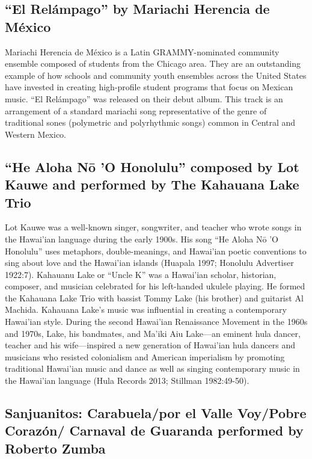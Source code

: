 \documentclass[twoside]{article}
\begin{document}
\hypertarget{el-reluxe1mpago-by-mariachi-herencia-de-muxe9xico}{%
\subsection*{``El Relámpago'' by Mariachi Herencia de
México}\label{el-reluxe1mpago-by-mariachi-herencia-de-muxe9xico}}

Mariachi Herencia de México is a Latin GRAMMY-nominated community
ensemble composed of students from the Chicago area. They are an
outstanding example of how schools and community youth ensembles across
the United States have invested in creating high-profile student
programs that focus on Mexican music. ``El Relámpago'' was released on
their debut album. This track is an arrangement of a standard mariachi
song representative of the genre of traditional sones (polymetric and
polyrhythmic songs) common in Central and Western Mexico.

\hypertarget{he-aloha-nux14d-o-honolulu-composed-by-lot-kauwe-and-performed-by-the-kahauana-lake-trio}{%
\subsection*{``He Aloha Nō 'O Honolulu'' composed by Lot Kauwe and
performed by The Kahauana Lake
Trio}\label{he-aloha-nux14d-o-honolulu-composed-by-lot-kauwe-and-performed-by-the-kahauana-lake-trio}}

Lot Kauwe was a well-known singer, songwriter, and teacher who wrote
songs in the Hawai'ian language during the early 1900s. His song ``He
Aloha Nō 'O Honolulu'' uses metaphors, double-meanings, and Hawai'ian
poetic conventions to sing about love and the Hawai'ian islands (Huapala
1997; Honolulu Advertiser 1922:7). Kahauanu Lake or ``Uncle K'' was a
Hawai'ian scholar, historian, composer, and musician celebrated for his
left-handed ukulele playing. He formed the Kahauana Lake Trio with
bassist Tommy Lake (his brother) and guitarist Al Machida. Kahauana
Lake's music was influential in creating a contemporary Hawai'ian style.
During the second Hawai'ian Renaissance Movement in the 1960s and 1970s,
Lake, his bandmates, and Ma'iki Aiu Lake---an eminent hula dancer,
teacher and his wife---inspired a new generation of Hawai'ian hula
dancers and musicians who resisted colonialism and American imperialism
by promoting traditional Hawai'ian music and dance as well as singing
contemporary music in the Hawai'ian language (Hula Records 2013;
Stillman 1982:49-50).

\hypertarget{sanjuanitos-carabuelapor-el-valle-voypobre-corazuxf3ncarnaval-de-guaranda-performed-by-roberto-zumba}{%
\raggedright
\subsection*{Sanjuanitos: Carabuela/por el Valle Voy/Pobre
Corazón/ \break Carnaval de Guaranda performed by Roberto
Zumba}\label{sanjuanitos-carabuelapor-el-valle-voypobre-corazuxf3ncarnaval-de-guaranda-performed-by-roberto-zumba}}
\end{document}
